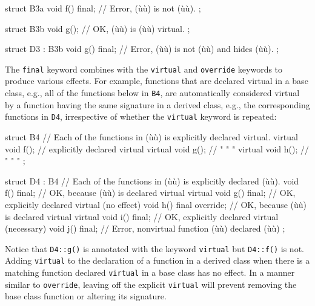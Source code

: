 {{\begin{emcppslisting}
struct B3a
{
    void f() final;  // Error, (ù{}ù) is not (ù{}ù).
};

struct B3b
{
    void g(); // OK, (ù{}ù) is (ù{}ù) virtual.
};

struct D3 : B3b
{
    void g() final; // Error, (ù{}ù) is not (ù{}ù) and hides (ù{}ù).
};
\end{emcppslisting}
    

\noindent The \lstinline!final! keyword combines with the \lstinline!virtual! and
\lstinline!override! keywords to produce various effects. For example,
functions that are declared virtual in a base class, e.g., all of the
functions below in \lstinline!B4!, are automatically considered virtual by
a function having the same signature in a derived class, e.g., the
corresponding functions in \lstinline!D4!, irrespective of whether the
\lstinline!virtual! keyword is repeated:

\begin{emcppslisting}
struct B4  // Each of the functions in (ù{}ù) is explicitly declared virtual.
{
    virtual void f();  // explicitly declared virtual
    virtual void g();  //      "        "       "
    virtual void h();  //      "        "       "
};

struct D4 : B4  // Each of the functions in (ù{}ù) is explicitly declared (ù{}ù).
{
    void f() final;          // OK, because (ù{}ù) is declared virtual
    virtual void g() final;  // OK, explicitly declared virtual (no effect)
    void h() final override; // OK, because (ù{}ù) is declared virtual
    virtual void i() final;  // OK, explicitly declared virtual (necessary)
    void j() final;          // Error, nonvirtual function (ù{}ù) declared (ù{}ù)
};
\end{emcppslisting}
    

\noindent Notice that \lstinline!D4::g()! is annotated with the keyword
\lstinline!virtual! but \lstinline!D4::f()! is not. Adding \lstinline!virtual! to
the declaration of a function in a derived class when there is a
matching function declared \lstinline!virtual! in a base class has no
effect. In a manner similar to \lstinline!override!, leaving off the
explicit \lstinline!virtual! will prevent removing the base class function
or altering its signature.

}}
